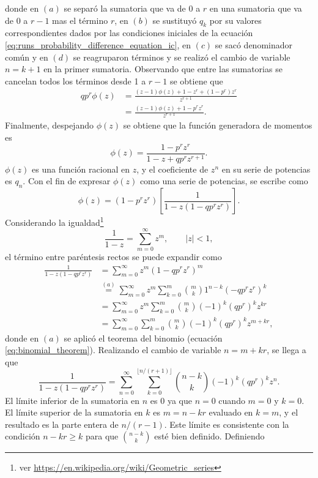 \documentclass[a4paper]{report}
\begin{document}
donde en \((a)\) se separó la sumatoria que va de 0 a \(r\) en una sumatoria que va de 0 a \(r-1\) mas el término \(r\), en \((b)\) se sustituyó \(q_k\) por su valores correspondientes dados por las condiciones iniciales de la ecuación \ref{eq:runs_probability_difference_equation_ic}, en \((c)\) se sacó denominador común y en \((d)\) se reagruparon términos y se realizó el cambio de variable \(n=k+1\) en la primer sumatoria. Observando que entre las sumatorias se cancelan todos los términos desde 1 a \(r-1\) se obtiene que
\begin{align*}
 qp^r\phi(z)&=\frac{(z-1)\phi(z)+1-z^r+(1-p^r)z^r}{z^{r+1}}\\
   &=\frac{(z-1)\phi(z)+1-p^rz^r}{z^{r+1}}.
\end{align*}
Finalmente, despejando \(\phi(z)\) se obtiene que la función generadora de momentos es
\[
 \phi(z)=\frac{1-p^rz^r}{1-z+qp^rz^{r+1}}.
\]
\(\phi(z)\) es una función racional en \(z\), y el coeficiente de \(z^n\) en su serie de potencias es \(q_n\). Con el fin de expresar \(\phi(z)\) como una serie de potencias, se escribe como
\[
 \phi(z)=(1-p^rz^r)\left[\frac{1}{1-z(1-qp^rz^{r})}\right].
\]
Considerando la igualdad\footnote{ver \url{https://en.wikipedia.org/wiki/Geometric_series}}
\begin{equation}\label{eq:geometric_series_convergence}
 \frac{1}{1-z}=\sum_{m=0}^{\infty}z^m,\qquad|z|<1,
\end{equation}
el término entre paréntesis rectos se puede expandir como
\begin{align*}
 \frac{1}{1-z(1-qp^rz^{r})}&=\sum_{m=0}^{\infty}z^m(1-qp^rz^{r})^m\\
   &\overset{(a)}{=}\sum_{m=0}^{\infty}z^m\sum_{k=0}^m\binom{m}{k}1^{n-k}(-qp^rz^{r})^k\\
   &=\sum_{m=0}^{\infty}z^m\sum_{k=0}^m\binom{m}{k}(-1)^k(qp^r)^kz^{kr}\\
   &=\sum_{m=0}^{\infty}\sum_{k=0}^m\binom{m}{k}(-1)^k(qp^r)^kz^{m+kr},
\end{align*}
donde en \((a)\) se aplicó el teorema del binomio (ecuación \ref{eq:binomial_theorem}). Realizando el cambio de variable \(n=m+kr\), se llega a que
\[
 \frac{1}{1-z(1-qp^rz^{r})}=\sum_{n=0}^{\infty}\sum_{k=0}^{\lfloor n/(r+1)\rfloor}\binom{n-k}{k}(-1)^k(qp^r)^kz^n.
\]
El límite inferior de la sumatoria en \(n\) es 0 ya que \(n=0\) cuando  \(m=0\) y \(k=0\). El límite superior de la sumatoria en \(k\) es \(m=n-kr\) evaluado en \(k=m\), y el resultado es la parte entera de \(n/(r-1)\). Este límite es consistente con la condición \(n-kr\geq k\) para que \(\binom{n-k}{k}\) esté bien definido. Definiendo
\end{document}
